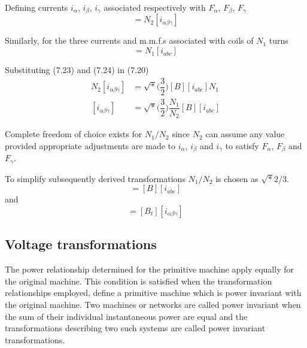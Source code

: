 \documentclass[a4paper,numbers=noenddot,12pt]{scrbook}
\begin{document}
        Defining currents $i_{\alpha}$, $i_{\beta}$, $i_{\gamma}$ associated respectively with $F_{\alpha}$, $F_{\beta}$, $F_{\gamma}$
        \begin{equation}
            [F_{\alpha \beta \gamma}] = N_2 [i_{\alpha \beta \gamma}]
            \label{eq:Eq7.23}
        \end{equation}

        Similarly, for the three currents and m.m.f.s associated with coils of $N_1$ turns
        \begin{equation}
            [F_{abc}] = N_1 [i_{abc}]
            \label{eq:Eq7.24}
        \end{equation}

        Substituting (7.23) and (7.24)  in (7.20)
        \begin{align}
            N_2[i_{\alpha \beta \gamma}] & = \sqrt*{\Big( \dfrac{3}{2}\Big) } [B] [i_{abc}] N_1 \nonumber \\
            [i_{\alpha \beta \gamma}] & = \sqrt*{\Big( \dfrac{3}{2} \Big) } \dfrac{N_1}{N_2} [B] [i_{abc}]
            \label{eq:Eq7.25}
        \end{align}

        Complete freedom of choice exists for $N_1 / N_2$ since $N_2$ can assume any value provided appropriate adjustments are made to $i_{\alpha}$, $i_{\beta}$ and $i_{\gamma}$ to satisfy $F_{\alpha}$, $F_{\beta}$ and $F_{\gamma}$.

        To simplify subsequently derived transformations $N_1 / N_2$ is chosen as $\sqrt*{2/3}$.
        \begin{equation}
            [i_{\alpha \beta \gamma}] = [B][i_{abc}]
            \label{eq:Eq7.26}
        \end{equation}
        and
        \begin{equation}
            [i_{abc}] = [B_t] [i_{\alpha \beta \gamma}]
            \label{eq:Eq7.27}
        \end{equation}

        \subsection{Voltage transformations}
        The power relationship determined  for the primitive machine apply equally for the original machine. This condition is satisfied when the transformation relationships employed, define a primitive machine which is power invariant with the original machine. Two machines or networks are called power invariant when the sum of their individual instantaneous power are equal and the transformations describing two such systems are called power
        invariant transformations.
\end{document}
